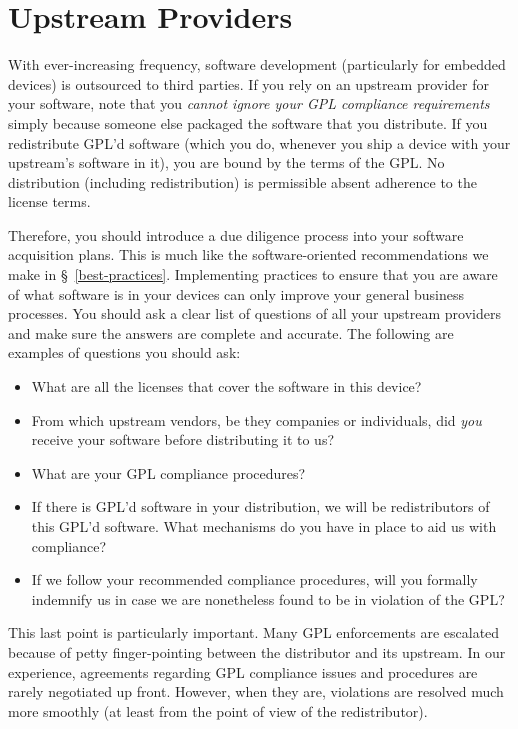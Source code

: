 \section{Upstream Providers}
\label{upstream}

With ever-increasing frequency, software development (particularly for
embedded devices) is outsourced to third parties.  If you rely on an
upstream provider for your software, note that you \emph{cannot ignore
  your GPL compliance requirements} simply because someone else packaged
the software that you distribute.  If you redistribute GPL'd software
(which you do, whenever you ship a device with your upstream's software in
it), you are bound by the terms of the GPL\@.  No distribution (including
redistribution) is permissible absent adherence to the license terms.

Therefore, you should introduce a due diligence process into your software
acquisition plans.  This is much like the software-oriented
recommendations we make in \S~\ref{best-practices}.  Implementing
practices to ensure that you are aware of what software is in your devices
can only improve your general business processes.  You should ask a clear
list of questions of all your upstream providers and make sure the answers
are complete and accurate.  The following are examples of questions you
should ask:
\begin{itemize}

\item What are all the licenses that cover the software in this device?

\item From which upstream vendors, be they companies or individuals, did
  \emph{you} receive your software before distributing it to us?

\item What are your GPL compliance procedures?

\item If there is GPL'd software in your distribution, we will be
  redistributors of this GPL'd software.  What mechanisms do you have in
  place to aid us with compliance?

\item If we follow your recommended compliance procedures, will you
  formally indemnify us in case we are nonetheless found to be in
  violation of the GPL?

\end{itemize}

This last point is particularly important.  Many GPL enforcements are
escalated because of petty finger-pointing between the distributor and its
upstream.  In our experience, agreements regarding GPL compliance issues
and procedures are rarely negotiated up front.  However, when they are,
violations are resolved much more smoothly (at least from the point of
view of the redistributor).

